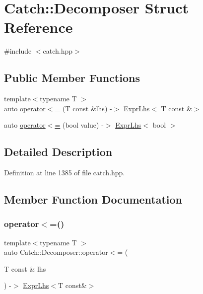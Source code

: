 \hypertarget{struct_catch_1_1_decomposer}{}\section{Catch\+:\+:Decomposer Struct Reference}
\label{struct_catch_1_1_decomposer}


{\ttfamily \#include $<$catch.\+hpp$>$}

\subsection*{Public Member Functions}
\begin{DoxyCompactItemize}
\item 
{\footnotesize template$<$typename T $>$ }\\auto \mbox{\hyperlink{struct_catch_1_1_decomposer_a20b5b8c0e2ff0328a019ae1a8deca03a}{operator$<$=}} (T const \&lhs) -\/$>$ \mbox{\hyperlink{class_catch_1_1_expr_lhs}{Expr\+Lhs}}$<$ T const \&$>$
\item 
auto \mbox{\hyperlink{struct_catch_1_1_decomposer_aac129b94903ae1339d5709049d83613b}{operator$<$=}} (bool value) -\/$>$ \mbox{\hyperlink{class_catch_1_1_expr_lhs}{Expr\+Lhs}}$<$ bool $>$
\end{DoxyCompactItemize}


\subsection{Detailed Description}


Definition at line 1385 of file catch.\+hpp.



\subsection{Member Function Documentation}
\mbox{\label{struct_catch_1_1_decomposer_a20b5b8c0e2ff0328a019ae1a8deca03a}} 
\subsubsection{\texorpdfstring{operator$<$=()}{operator<=()}\hspace{0.1cm}{\footnotesize\ttfamily [1/2]}}
{\footnotesize\ttfamily template$<$typename T $>$ \\
auto Catch\+::\+Decomposer\+::operator$<$= (\begin{DoxyParamCaption}\item[{T const \&}]{lhs }\end{DoxyParamCaption}) -\/$>$ \mbox{\hyperlink{class_catch_1_1_expr_lhs}{Expr\+Lhs}}$<$T const\&$>$ \hspace{0.3cm}{\ttfamily [inline]}}



